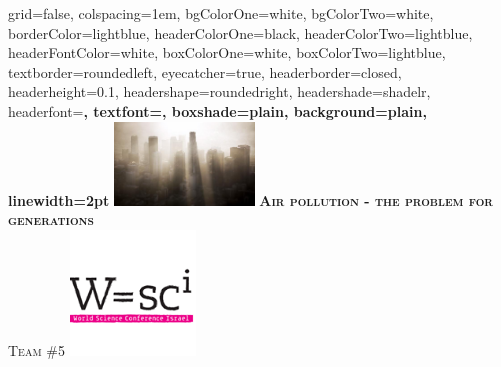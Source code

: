 \documentclass[landscape,final,a0paper,fontscale=0.285]{baposter}
\begin{document}
\begin{poster}%
  {
  grid=false,
  colspacing=1em,
  bgColorOne=white,
  bgColorTwo=white,
  borderColor=lightblue,
  headerColorOne=black,
  headerColorTwo=lightblue,
  headerFontColor=white,
  boxColorOne=white,
  boxColorTwo=lightblue,
  textborder=roundedleft,
  eyecatcher=true,
  headerborder=closed,
  headerheight=0.1\textheight,
  headershape=roundedright,
  headershade=shadelr,
  headerfont=\Large\bf\textsc, %
  textfont={\setlength{\parindent}{1.5em}},
  boxshade=plain,
  background=plain,
  linewidth=2pt
  }
  {\includegraphics[height=6em]{logo_left}} 
  {{\bf\textsc{Air pollution - the problem for generations}\vspace{0.5em}} \\ }
  {\textsc{Team \#5}}
  {%
    \includegraphics[height=9.0em]{logo_wsci}
  }

    \newcommand{\colouredcircle}{%
      \tikz{\useasboundingbox (-0.2em,-0.32em) rectangle(0.2em,0.32em); \draw[draw=black,fill=lightblue,line width=0.03em] (0,0) circle(0.18em);}}


\end{poster}
\end{document}
